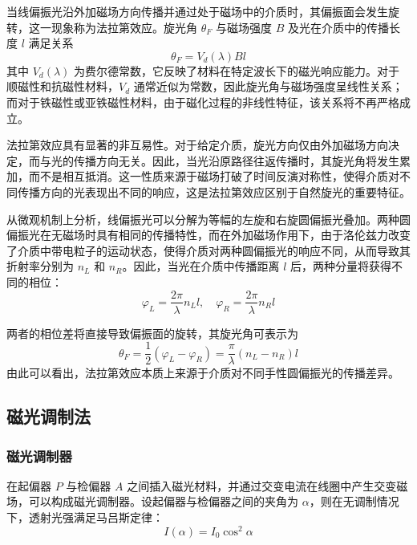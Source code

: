\documentclass[a4paper, 1.5lines]{ctexart}
\begin{document}
当线偏振光沿外加磁场方向传播并通过处于磁场中的介质时，其偏振面会发生旋转，这一现象称为法拉第效应。旋光角 $\theta_F$ 与磁场强度 $B$ 及光在介质中的传播长度 $l$ 满足关系
\begin{equation}
    \theta_F = V_d(\lambda) B l
\end{equation}
其中 $V_d(\lambda)$ 为费尔德常数，它反映了材料在特定波长下的磁光响应能力。对于顺磁性和抗磁性材料，$V_d$ 通常近似为常数，因此旋光角与磁场强度呈线性关系；而对于铁磁性或亚铁磁性材料，由于磁化过程的非线性特征，该关系将不再严格成立。

法拉第效应具有显著的非互易性。对于给定介质，旋光方向仅由外加磁场方向决定，而与光的传播方向无关。因此，当光沿原路径往返传播时，其旋光角将发生累加，而不是相互抵消。这一性质来源于磁场打破了时间反演对称性，使得介质对不同传播方向的光表现出不同的响应，这是法拉第效应区别于自然旋光的重要特征。

从微观机制上分析，线偏振光可以分解为等幅的左旋和右旋圆偏振光叠加。两种圆偏振光在无磁场时具有相同的传播特性，而在外加磁场作用下，由于洛伦兹力改变了介质中带电粒子的运动状态，使得介质对两种圆偏振光的响应不同，从而导致其折射率分别为 $n_L$ 和 $n_R$。因此，当光在介质中传播距离 $l$ 后，两种分量将获得不同的相位：
\begin{equation}
    \varphi_L = \frac{2\pi}{\lambda} n_L l, \quad
    \varphi_R = \frac{2\pi}{\lambda} n_R l
\end{equation}

两者的相位差将直接导致偏振面的旋转，其旋光角可表示为
\begin{equation}
    \theta_F = \frac{1}{2}(\varphi_L - \varphi_R) = \frac{\pi}{\lambda}(n_L - n_R)l
\end{equation}
由此可以看出，法拉第效应本质上来源于介质对不同手性圆偏振光的传播差异。

\subsection{磁光调制法}

\subsubsection{磁光调制器}

在起偏器 $P$ 与检偏器 $A$ 之间插入磁光材料，并通过交变电流在线圈中产生交变磁场，可以构成磁光调制器。设起偏器与检偏器之间的夹角为 $\alpha$，则在无调制情况下，透射光强满足马吕斯定律：
\begin{equation}
    I(\alpha) = I_0 \cos^2 \alpha
\end{equation}
\end{document}

